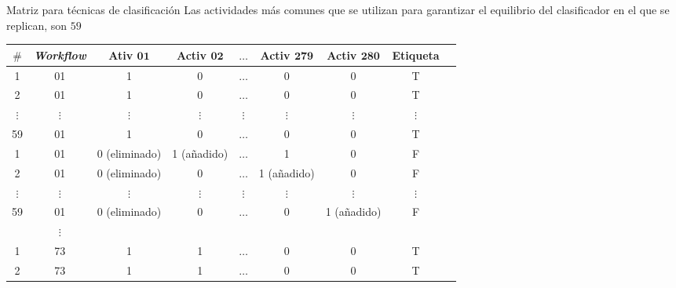 \begin{frame}		
	\begin{block}{Matriz para técnicas de clasificación}
		Las actividades más comunes que se utilizan para garantizar el equilibrio del clasificador en el que se replican, son \(59\) 
		\begin{table}[!htb]
			\footnotesize
			\centering
			\begin{tabular}{|c|c|c|c|c|c|c|c|c|}  \hline
				\textbf{\(\#\)} & \textbf{\emph{Workflow}} & \textbf{Ativ \(\mathbf{01}\)} & \textbf{Activ \(\mathbf{02}\)} & \textbf{\(\mathbf{\ldots}\)}  & \textbf{Activ \(\mathbf{279}\)} & \textbf{Activ \(\mathbf{280}\)} & \textbf{Etiqueta} \\ \hline
				
				1	&		01		 			   & 1 			  & 0 			  & \(\ldots\) 	  & 0 & 0  			& T	\\ \hline
				2	&		01 					   & 1 			  & 0 			  & \(\ldots\) 	  & 0 & 0  			& T	\\ \hline
				\(\vdots\)  &  \(\vdots\) 	   	   & \(\vdots\)   & \(\vdots\) 	  & \(\vdots\) 	  & \(\vdots\) & \(\vdots\) & \(\vdots\)\\ \hline
				59	&		01 					   & 1 			  & 0 			  & \(\ldots\) 	  & 0 & 0   		& T	\\ \hline
				1	&		01		 			   & 0 (eliminado) 		  & 1 (añadido) &\(\ldots\)& 1 & 0	& F	\\ \hline
				2	&		01 					   & 0 (eliminado)& 0 		  & \(\ldots\) 	  & 1 (añadido) & 0& F	\\ \hline
				\(\vdots\)  &		\(\vdots\) 	   & \(\vdots\) & \(\vdots\) 	  & \(\vdots\) 	  & \(\vdots\) & \(\vdots\) & \(\vdots\) \\ \hline
				59	&		01 					   & 0 (eliminado)			  & 0 			  & \(\ldots\) & 0 & 1 (añadido)& F \\ \hline
				&\(\vdots\) & & & & & & 																		\\ \hline
				1	&		73		 			   & 1 			  & 1  & \(\ldots\) 	  & 0 & 0  			& T	\\ \hline
				2	&		73 					   & 1 			  & 1  & \(\ldots\) 	  & 0 & 0  			& T	\\ \hline
			\end{tabular}
			\label{tabela_matriz_de_dados_adapatada_classificacao_regressao}
		\end{table}
	\end{block}
\end{frame}


